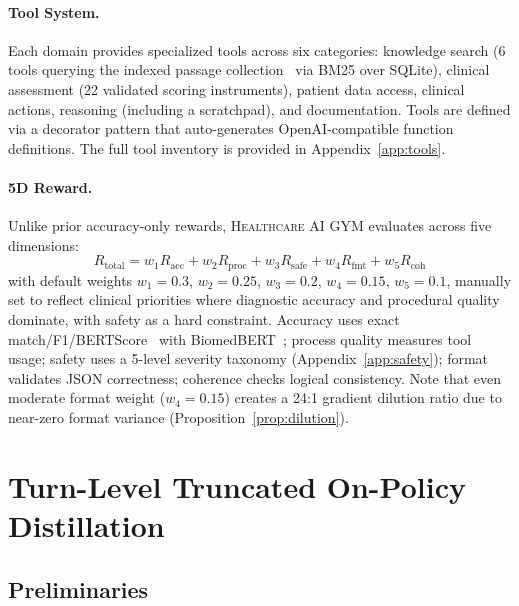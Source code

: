 \documentclass{article}
\newcommand{\gym}{\textsc{Healthcare AI GYM}}
\begin{document}
\paragraph{Tool System.} Each domain provides specialized tools across six categories: knowledge search (6 tools querying the indexed passage collection~\citep{xiong2024medcpt} via BM25 over SQLite), clinical assessment (22 validated scoring instruments), patient data access, clinical actions, reasoning (including a scratchpad), and documentation. Tools are defined via a decorator pattern that auto-generates OpenAI-compatible function definitions. The full tool inventory is provided in Appendix~\ref{app:tools}.

\paragraph{5D Reward.} Unlike prior accuracy-only rewards, \gym{} evaluates across five dimensions:
\begin{equation}
    R_{\text{total}} = w_1 R_{\text{acc}} + w_2 R_{\text{proc}} + w_3 R_{\text{safe}} + w_4 R_{\text{fmt}} + w_5 R_{\text{coh}}
\label{eq:reward}
\end{equation}
with default weights $w_1{=}0.3$, $w_2{=}0.25$, $w_3{=}0.2$, $w_4{=}0.15$, $w_5{=}0.1$, manually set to reflect clinical priorities where diagnostic accuracy and procedural quality dominate, with safety as a hard constraint. Accuracy uses exact match/F1/BERTScore~\citep{zhang2020bertscore} with BiomedBERT~\citep{gu2021pubmedbert}; process quality measures tool usage; safety uses a 5-level severity taxonomy (Appendix~\ref{app:safety}); format validates JSON correctness; coherence checks logical consistency. Note that even moderate format weight ($w_4{=}0.15$) creates a 24:1 gradient dilution ratio due to near-zero format variance (Proposition~\ref{prop:dilution}).


\section{Turn-Level Truncated On-Policy Distillation}
\label{sec:training}

\subsection{Preliminaries}
\label{sec:preliminaries}
\end{document}
